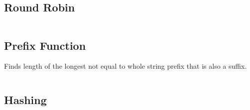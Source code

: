\documentclass[8pt,a4paper,landscape,oneside]{amsart}
\newcommand{\code}[1]{\inputminted[fontsize=\normalsize,baselinestretch=1]{cpp}{_code/#1}}
\begin{document}
\begin{multicols*}{3}
	\subsection{Round Robin}

	\code{miscellaneous/round_robin.cpp}
	
	\subsection{Prefix Function}
	
	Finds length of the longest not equal to whole string prefix that is also a suffix.
	
	\code{miscellaneous/prefix_function.cpp}
	
	\subsection{Hashing}
	
	\code{miscellaneous/hashing.cpp}

\end{multicols*}
\end{document}
